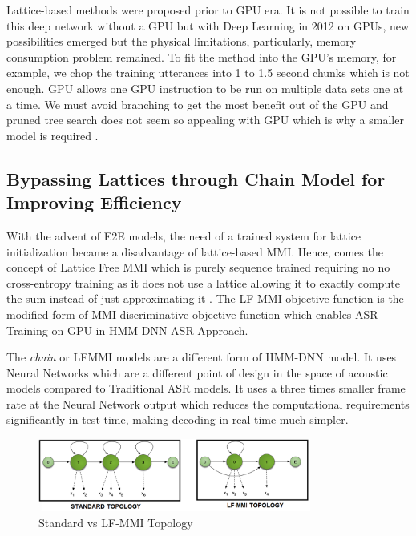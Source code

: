 Lattice-based methods were proposed prior to GPU era. It is not possible to train this deep network without a GPU but with Deep Learning in 2012 on GPUs, new possibilities emerged but the physical limitations, particularly, memory consumption problem remained. To fit the method into the GPU's memory, for example, we chop the training utterances into 1 to 1.5 second chunks which is not enough. GPU allows one GPU instruction to be run on multiple data sets one at a time. We must avoid branching to get the most benefit out of the GPU and pruned tree search does not seem so appealing with GPU which is why a smaller model is required \cite{povey_purely_2016}.

\subsection{Bypassing Lattices through Chain Model for \\ Improving Efficiency}
With the advent of E2E models, the need of a trained system for lattice initialization became a disadvantage of lattice-based MMI. Hence, comes the concept of Lattice Free MMI \cite{povey_purely_2016, ghahremani_investigation_2017} which is purely sequence trained requiring no no cross-entropy training as it does not use a lattice allowing it to exactly compute the sum instead of just approximating it \cite{noauthor_lattice_nodate}. The LF-MMI objective function is the modified form of MMI discriminative  objective function which enables ASR Training on GPU in HMM-DNN ASR Approach. 

The \textit{chain} or LFMMI models are a different form of HMM-DNN model. It uses Neural Networks \cite{daniel_povey_kaldi_nodate} which are a different point of design in the space of acoustic models compared to Traditional ASR models. It uses a three times smaller frame rate at the Neural Network output which reduces the computational requirements significantly in test-time, making decoding in real-time  much simpler. 

\begin{figure}[h]
    \centering
    \includegraphics[width=0.8\textwidth]{img/LFMMI1.png}
    \caption{Standard vs LF-MMI Topology}
    \label{fig:LFMMI-topology}
\end{figure}

